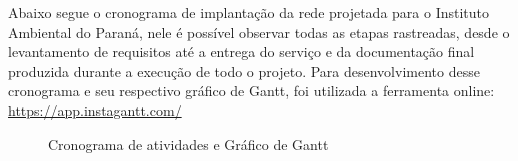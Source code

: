 \documentclass[	DIV=calc,%
							paper=a4,%
							fontsize=12pt,%
							onecolumn]{scrartcl}	 					%
\begin{document}

Abaixo segue o cronograma de implantação da rede projetada para o Instituto Ambiental do Paraná, nele é possível observar todas as etapas rastreadas, desde o levantamento de requisitos até a entrega do serviço e da documentação final produzida durante a execução de todo o projeto.
Para desenvolvimento desse cronograma e seu respectivo gráfico de Gantt, foi utilizada a ferramenta online: \href{https://app.instagantt.com/}{https://app.instagantt.com/} 

\clearpage 
\thispagestyle{plain}
\recalctypearea
\begin{figure}
	\noindent{}
	\caption[Cronograma de atividades e Gráfico de Gantt]{Cronograma de atividades e Gráfico de Gantt}
	\label{figura9}
\end{figure}


\clearpage
{}
\recalctypearea
\end{document}
